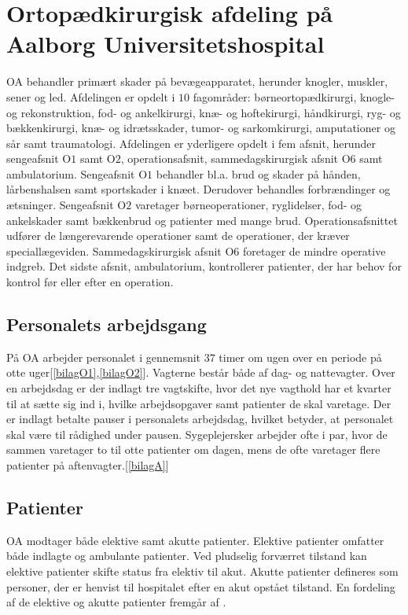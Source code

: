 \section{Ortopædkirurgisk afdeling på Aalborg Universitetshospital}
OA behandler primært skader på bevægeapparatet, herunder knogler, muskler, sener og led. Afdelingen er opdelt i $10$ fagområder: børneortopædkirurgi, knogle- og rekonstruktion, fod- og ankelkirurgi, knæ- og hoftekirurgi, håndkirurgi, ryg- og bækkenkirurgi, knæ- og idrætsskader, tumor- og sarkomkirurgi, amputationer og sår samt traumatologi. Afdelingen er yderligere opdelt i fem afsnit, herunder sengeafsnit O$1$ samt O$2$, operationsafsnit, sammedagskirurgisk afsnit O$6$ samt ambulatorium. 
Sengeafsnit O$1$ behandler bl.a. brud og skader på hånden, lårbenshalsen samt sportskader i knæet. Derudover behandles forbrændinger og ætsninger. Sengeafsnit O$2$ varetager børneoperationer, ryglidelser, fod- og ankelskader samt bækkenbrud og patienter med mange brud. Operationsafsnittet udfører de længerevarende operationer samt de operationer, der kræver speciallægeviden. Sammedagskirurgisk afsnit O$6$ foretager de mindre operative indgreb. Det sidste afsnit, ambulatorium, kontrollerer patienter, der har behov for kontrol før eller efter en operation.\cite{Aalborg2016}

\subsection{Personalets arbejdsgang} \label{arb_per}
På OA arbejder personalet i gennemsnit $37$ timer om ugen over en periode på otte uger\cite{Danske2015}[\ref{bilagO1},\ref{bilagO2}]. Vagterne består både af dag- og nattevagter. Over en arbejdsdag er der indlagt tre vagtskifte, hvor det nye vagthold har et kvarter til at sætte sig ind i, hvilke arbejdsopgaver samt patienter de skal varetage. Der er indlagt betalte pauser i personalets arbejdsdag, hvilket betyder, at personalet skal være til rådighed under pausen. Sygeplejersker arbejder ofte i par, hvor de sammen varetager to til otte patienter om dagen, mens de ofte varetager flere patienter på aftenvagter.[\ref{bilagA}]

\subsection{Patienter}
OA modtager både elektive samt akutte patienter. Elektive patienter omfatter både indlagte og ambulante patienter. Ved pludselig forværret tilstand kan elektive patienter skifte status fra elektiv til akut. Akutte patienter defineres som personer, der er henvist til hospitalet efter en akut opstået tilstand.\cite{RegionNord2016} En fordeling af de elektive og akutte patienter fremgår af .


